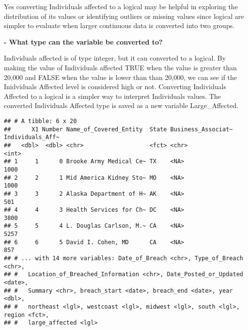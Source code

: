 \documentclass[
]{article}
\newenvironment{Shaded}{\begin{snugshade}}{\end{snugshade}}
\newcommand{\ConstantTok}[1]{\textcolor[rgb]{0.00,0.00,0.00}{#1}}
\newcommand{\ControlFlowTok}[1]{\textcolor[rgb]{0.13,0.29,0.53}{\textbf{#1}}}
\newcommand{\DecValTok}[1]{\textcolor[rgb]{0.00,0.00,0.81}{#1}}
\newcommand{\FunctionTok}[1]{\textcolor[rgb]{0.00,0.00,0.00}{#1}}
\newcommand{\NormalTok}[1]{#1}
\newcommand{\OtherTok}[1]{\textcolor[rgb]{0.56,0.35,0.01}{#1}}
\newcommand{\SpecialCharTok}[1]{\textcolor[rgb]{0.00,0.00,0.00}{#1}}
\begin{document}
Yes converting Individuals affected to a logical may be helpful in
exploring the distribution of its values or identifying outliers or
missing values since logical are simpler to evaluate when larger
continuous data is converted into two groups.

\textbf{- What type can the variable be converted to?}

Individuals affected is of type integer, but it can converted to a
logical. By making the value of Individuals affected TRUE when the value
is greater than 20,000 and FALSE when the value is lower than than
20,000, we can see if the Inidviduals Affected level is considered high
or not. Converting Individuals Affected to a logical is a simpler way to
interpret Individuals values. The converted Individuals Affected type is
saved as a new variable Large\_Affected.

\begin{Shaded}
\end{Shaded}

\begin{verbatim}
## # A tibble: 6 x 20
##      X1 Number Name_of_Covered_Entity  State Business_Associat~ Individuals_Aff~
##   <dbl>  <dbl> <chr>                   <fct> <chr>                         <int>
## 1     1      0 Brooke Army Medical Ce~ TX    <NA>                           1000
## 2     2      1 Mid America Kidney Sto~ MO    <NA>                           1000
## 3     3      2 Alaska Department of H~ AK    <NA>                            501
## 4     4      3 Health Services for Ch~ DC    <NA>                           3800
## 5     5      4 L. Douglas Carlson, M.~ CA    <NA>                           5257
## 6     6      5 David I. Cohen, MD      CA    <NA>                            857
## # ... with 14 more variables: Date_of_Breach <chr>, Type_of_Breach <chr>,
## #   Location_of_Breached_Information <chr>, Date_Posted_or_Updated <date>,
## #   Summary <chr>, breach_start <date>, breach_end <date>, year <dbl>,
## #   northeast <lgl>, westcoast <lgl>, midwest <lgl>, south <lgl>, region <fct>,
## #   large_affected <lgl>
\end{verbatim}
\end{document}
